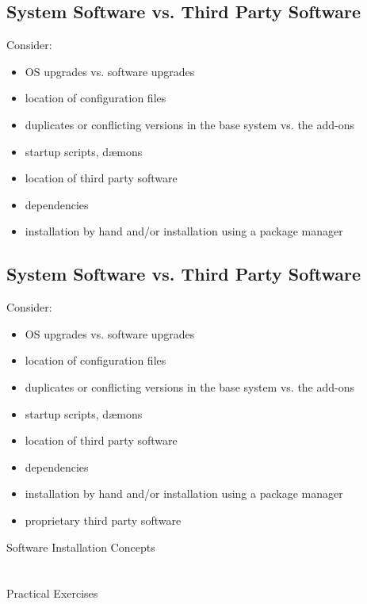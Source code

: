 \documentclass[xga]{xdvislides}
\begin{document}
\subsection{System Software vs. Third Party Software}
Consider:
\begin{itemize}
	\item OS upgrades vs. software upgrades
	\item location of configuration files
	\item duplicates or conflicting versions in the base system vs. the
		add-ons
	\item startup scripts, d{\ae}mons
	\item location of third party software
	\item dependencies
	\item installation by hand and/or installation using a package manager
\end{itemize}


\subsection{System Software vs. Third Party Software}
Consider:
\begin{itemize}
	\item OS upgrades vs. software upgrades
	\item location of configuration files
	\item duplicates or conflicting versions in the base system vs. the
		add-ons
	\item startup scripts, d{\ae}mons
	\item location of third party software
	\item dependencies
	\item installation by hand and/or installation using a package manager
	\item proprietary third party software
\end{itemize}


\newpage
\vspace*{\fill}
\begin{center}
	\Hugesize
		Software Installation Concepts \\ [1em]
	\hspace*{5mm}
	\blueline\\
	\hspace*{5mm}\\
		Practical Exercises
\end{center}
\vspace*{\fill}
\end{document}

